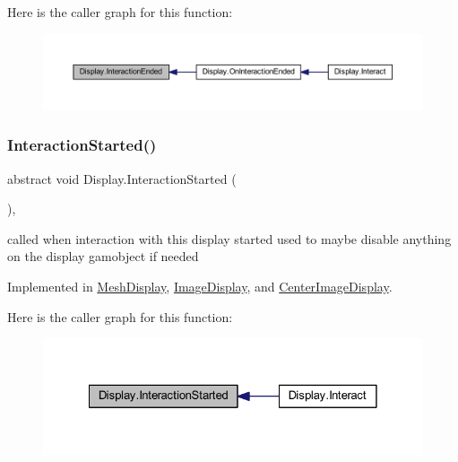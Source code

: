 Here is the caller graph for this function\+:
\nopagebreak
\begin{figure}[H]
\begin{center}
\leavevmode
\includegraphics[width=350pt]{class_display_a6fd38485267e1b78f1d1dfb589ec4ae0_icgraph}
\end{center}
\end{figure}
\mbox{\label{class_display_a21c51fcf185403197a78a5acfd2065de}} 
\subsubsection{\texorpdfstring{Interaction\+Started()}{InteractionStarted()}}
{\footnotesize\ttfamily abstract void Display.\+Interaction\+Started (\begin{DoxyParamCaption}{ }\end{DoxyParamCaption})\hspace{0.3cm}{\ttfamily [protected]}, {}}



called when interaction with this display started used to maybe disable anything on the display gamobject if needed 



Implemented in \mbox{\hyperlink{class_mesh_display_aa4affc65c23027c877f511fc2b8aaeb8}{Mesh\+Display}}, \mbox{\hyperlink{class_image_display_a1fdf91b09cd5329059d38033f1330ffb}{Image\+Display}}, and \mbox{\hyperlink{class_center_image_display_a2944541a38bcc65b7fff15200c9f0fc3}{Center\+Image\+Display}}.

Here is the caller graph for this function\+:
\nopagebreak
\begin{figure}[H]
\begin{center}
\leavevmode
\includegraphics[width=328pt]{class_display_a21c51fcf185403197a78a5acfd2065de_icgraph}
\end{center}
\end{figure}
\mbox{\label{class_display_a29f45efdf15e97219d2c8a614d699da8}} 
